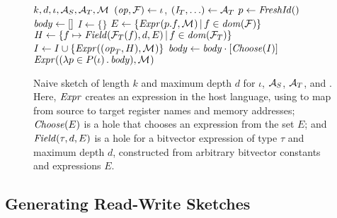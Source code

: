 \begin{figure}
\begin{algorithmic}[1] 
    {$k, d, \iota , \mathcal{A}_S, \mathcal{A}_T, \mathcal{M}_{}$} 
    \State $(\mathit{op}, \mathcal{F}) \gets \iota$, $(\mathit{I}_T, \ldots) \gets \mathcal{A}_T$ 
    \State $p \gets \mathit{FreshId}()$ 
    \State $\mathit{body}\gets []$  
     
      \State $I \gets \{\}$  
        \label{li:instruction-hole}
        \State $E \gets \{\mathit{Expr}(p.f, \mathcal{M}_{}) \,|\, f\in\mathit{dom}(\mathcal{F})\}$ 
        \State $H \gets \{ f\mapsto \mathit{Field}(\mathcal{F}_T(f),d,E) \,|\, f\in\mathit{dom}(\mathcal{F}_T)\} $ \label{li:field-holes}
        \State $I\gets I \cup \{ \mathit{Expr}((\mathit{op}_T, H), \mathcal{M}_{}) \}$ 
      \EndFor
      \State $\mathit{body} \gets \mathit{body} \cdot [\mathit{Choose}(I)]$ 
    \EndFor
    \State \Return $\mathit{Expr}((\lambda p\in P(\iota)\, .\, \mathit{body}),\mathcal{M}_{})$ 
  \EndFunction
\end{algorithmic}
\caption{Naive sketch of length $k$ and maximum depth $d$ for $\iota$, $\mathcal{A}_S$,
$\mathcal{A}_T$, and \Map. Here, $\mathit{Expr}$ creates an expression in the host language, 
using \Map to map from source to target register names and memory addresses;
$\mathit{Choose}(E)$ is a hole that chooses an expression from the set $E$; and
$\mathit{Field}(\tau,d,E)$ is a hole for a bitvector expression of type
$\tau$ and maximum depth $d$, constructed from arbitrary bitvector constants and
expressions $E$.\tighten}\label{fig:naive-sketch}
\end{figure}


\subsection{Generating Read-Write Sketches}\label{s:algorithm:rw} 

